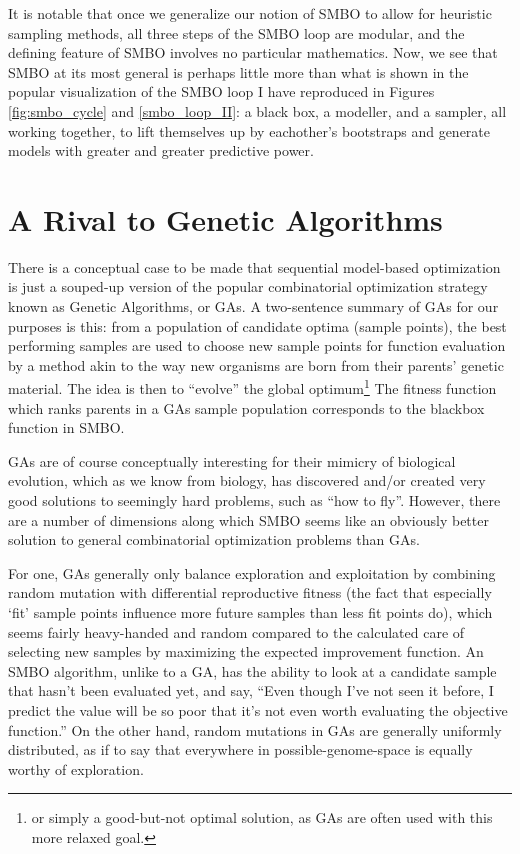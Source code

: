 It is notable that once we generalize our notion of SMBO to allow for heuristic sampling methods, all three steps of the SMBO loop are modular, and the defining feature of SMBO involves no particular mathematics. Now, we see that SMBO at its most general is perhaps little more than what is shown in the popular visualization of the SMBO loop I have reproduced in Figures \ref{fig:smbo_cycle} and \ref{smbo_loop_II}: a black box, a modeller, and a sampler, all working together, to lift themselves up by eachother's bootstraps and generate models with greater and greater predictive power.


\section{A Rival to Genetic Algorithms}

There is a conceptual case to be made that sequential model-based optimization is just a souped-up version of the popular combinatorial optimization strategy known as Genetic Algorithms, or GAs. A two-sentence summary of GAs for our purposes is this: from a population of candidate optima (sample points), the best performing samples are used to choose new sample points for function evaluation by a method akin to the way new organisms are born from their parents' genetic material. The idea is then to ``evolve'' the global optimum\footnote{or simply a good-but-not optimal solution, as GAs are often used with this more relaxed goal.} The fitness function which ranks parents in a GAs sample population corresponds to the blackbox function in SMBO.

GAs are of course conceptually interesting for their mimicry of biological evolution, which as we know from biology, has discovered and/or created very good solutions to seemingly hard problems, such as ``how to fly''. However, there are a number of dimensions along which SMBO seems like an obviously better solution to general combinatorial optimization problems than GAs.

For one, GAs generally only balance exploration and exploitation by combining random mutation with differential reproductive fitness (the fact that especially `fit' sample points influence more future samples than less fit points do), which seems fairly heavy-handed and random compared to the calculated care of selecting new samples by maximizing the expected improvement function. An SMBO algorithm, unlike to a GA, has the ability to look at a candidate sample that hasn't been evaluated yet, and say, ``Even though I've not seen it before, I predict the value will be so poor that it's not even worth evaluating the objective function.'' On the other hand, random mutations in GAs are generally uniformly distributed, as if to say that everywhere in possible-genome-space is equally worthy of exploration.

